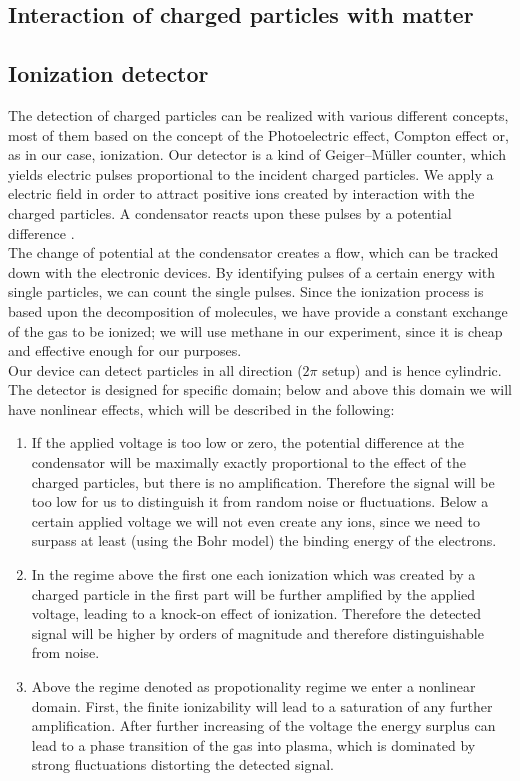 \subsection{Interaction of charged particles with matter}
\label{subsec:interaction}




\subsection{Ionization detector}
\label{subsec:detector}
The detection of charged particles can be realized with various different concepts, most of them based on
the concept of the Photoelectric effect, Compton effect or, as in our case, ionization. Our detector is a
kind of Geiger–Müller counter, which yields electric pulses proportional to the incident charged particles.
We apply a electric field in order to attract positive ions created by interaction with the charged particles.
A condensator reacts upon these pulses by a potential difference \cite{staatsexamen}. \\
The change of potential at the condensator
creates a flow, which can be tracked down with the electronic devices. By identifying pulses of a certain
energy with single particles, we can count the single pulses. Since the ionization process is based upon the
decomposition of molecules, we have provide a constant exchange of the gas to be ionized; we will use
methane in our experiment, since it is cheap and effective enough for our purposes\cite{staatsexamen}. \\
Our device can detect particles in all direction ($2\pi$ setup) and is hence cylindric.
The detector is designed for specific domain; below and above this domain we will have nonlinear effects,
which will be described in the following:
\begin{enumerate}
\item If the applied voltage is too low or zero, the potential difference at the condensator will be maximally
exactly proportional to the effect of the charged particles, but there is no amplification. Therefore the
signal will be too low for us to distinguish it from random noise or fluctuations. Below a certain 
applied voltage we will not even create any ions, since we need to surpass at least (using the Bohr model) the
binding energy of the electrons.
\item In the regime above the first one each ionization which was created by a charged particle in the first part will be further
amplified by the applied voltage, leading to a knock-on effect of ionization. Therefore the detected signal
will be higher by orders of magnitude and therefore distinguishable from noise.
\item Above the regime denoted as propotionality regime we enter a nonlinear domain. First, the finite 
ionizability will lead to a saturation of any further amplification. After further increasing of the voltage
the energy surplus can lead to a phase transition of the gas into plasma, which is dominated by strong
fluctuations distorting the detected signal.
\end{enumerate}
